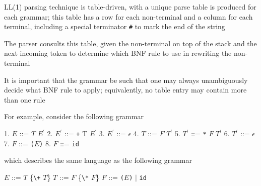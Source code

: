 \documentclass[8pt,a4paper,compress]{beamer}
\newcommand{\mm}[1]{$#1$}
\newcommand{\expo}[2]{$#1^{#2}$}
\newenvironment{spaced}
{
\smallskip
\hspace{.5cm}
\begin{minipage}[c]{\textwidth}
}
{
\end{minipage}
\smallskip
}
\begin{document}
\begin{frame}[fragile]
\pause

LL(1) parsing technique is table-driven, with a unique parse table is produced for each grammar; this table has a row for each non-terminal and a column for each terminal, including a special terminator \lstinline{#} to mark the end of the string

\pause
\bigskip

The parser consults this table, given the non-terminal on top of the stack and the next incoming token to determine which BNF rule to use in rewriting the non-terminal

\pause
\bigskip

It is important that the grammar be such that one may always unambiguously decide what BNF rule to apply; equivalently, no table entry may contain more than one rule

\pause
\bigskip

For example, consider the following grammar

\text{ }
\begin{spaced}
\begin{production}
1. \mm{E}  ::= \mm{T} \expo{E}{\prime}
2. \expo{E}{\prime} ::= \lstinline{+} T \expo{E}{\prime}
3. \expo{E}{\prime} ::= \mm{\epsilon}
4. \mm{T}  ::= \mm{F} \expo{T}{\prime}
5. \expo{T}{\prime} ::= \lstinline{*} \mm{F} \expo{T}{\prime}
6. \expo{T}{\prime} ::= \mm{\epsilon}
7. \mm{F}  ::= \lstinline{(}\mm{E}\lstinline{)}
8. \mm{F}  ::= \lstinline{id}
\end{production}
\end{spaced}

which describes the same language as the following grammar

\text{ }
\begin{spaced}
\begin{production}
\mm{E} ::= \mm{T} \{\lstinline{\+} \mm{T}\}
\mm{T} ::= \mm{F} \{\lstinline{\*} \mm{F}\}
\mm{F} ::= \lstinline{(}\mm{E}\lstinline{)} \mm{|} \lstinline{id}
\end{production}
\end{spaced}
\end{frame}
\end{document}
